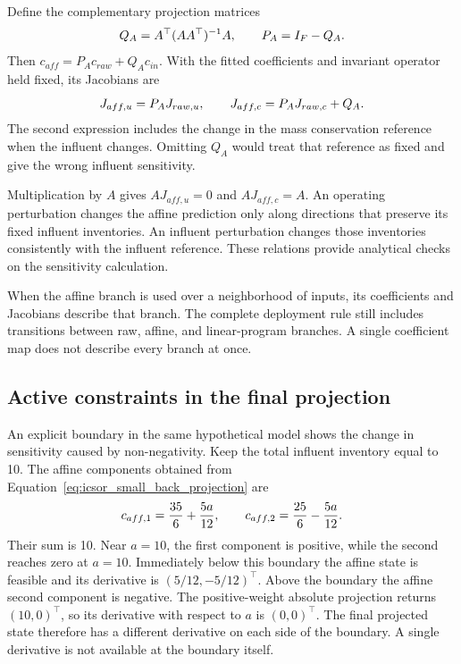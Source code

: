 Define the complementary projection matrices
\begin{equation}
\equationname{Complementary mass conservation projection matrices}
\label{eq:icsor_projection_matrices}
Q_A=A^\top(AA^\top)^{-1}A,
\qquad P_A=I_F-Q_A.
\end{equation}
Then \(c_{aff}=P_Ac_{raw}+Q_Ac_{in}\). With the fitted coefficients and invariant operator held fixed, its Jacobians are
\begin{equation}
\equationname{Operating and influent Jacobians of the affine-projected state}
\label{eq:icsor_affine_jacobians}
J_{aff,u}=P_AJ_{raw,u},
\qquad J_{aff,c}=P_AJ_{raw,c}+Q_A.
\end{equation}
The second expression includes the change in the mass conservation reference when the influent changes. Omitting \(Q_A\) would treat that reference as fixed and give the wrong influent sensitivity.

Multiplication by \(A\) gives \(AJ_{aff,u}=0\) and \(AJ_{aff,c}=A\). An operating perturbation changes the affine prediction only along directions that preserve its fixed influent inventories. An influent perturbation changes those inventories consistently with the influent reference. These relations provide analytical checks on the sensitivity calculation.

When the affine branch is used over a neighborhood of inputs, its coefficients and Jacobians describe that branch. The complete deployment rule still includes transitions between raw, affine, and linear-program branches. A single coefficient map does not describe every branch at once.

\subsection{Active constraints in the final projection}

An explicit boundary in the same hypothetical model shows the change in sensitivity caused by non-negativity. Keep the total influent inventory equal to 10. The affine components obtained from Equation~\eqref{eq:icsor_small_back_projection} are
\begin{equation}
\equationname{Illustrative affine-projected components as functions of an operating input}
\label{eq:icsor_small_affine_branch}
c_{aff,1}=\frac{35}{6}+\frac{5a}{12},
\qquad
c_{aff,2}=\frac{25}{6}-\frac{5a}{12}.
\end{equation}
Their sum is 10. Near \(a=10\), the first component is positive, while the second reaches zero at \(a=10\). Immediately below this boundary the affine state is feasible and its derivative is \((5/12,-5/12)^\top\). Above the boundary the affine second component is negative. The positive-weight absolute projection returns \((10,0)^\top\), so its derivative with respect to \(a\) is \((0,0)^\top\). The final projected state therefore has a different derivative on each side of the boundary. A single derivative is not available at the boundary itself.

